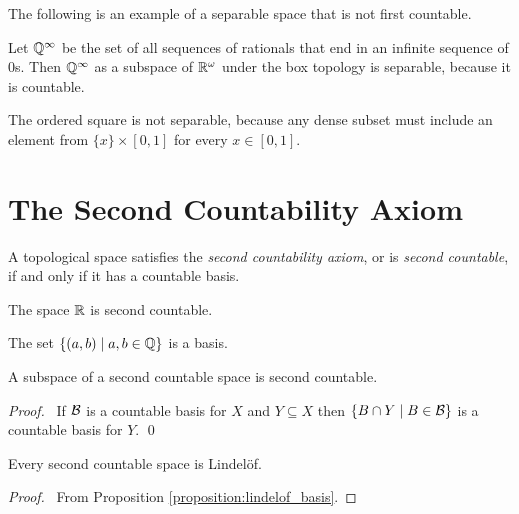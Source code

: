 The following is an example of a separable space that is not first countable.
\begin{example}[Choice]
    Let $\mathbb{Q}^\infty$ be the set of all sequences of rationals that end in an
    infinite sequence of 0s. Then $\mathbb{Q}^\infty$ as a subspace of $\mathbb{R}^\omega$
    under the box topology is separable, because it is countable.
\end{example}

\begin{example}
    The ordered square is not separable, because any dense subset must include
    an element from $\{x\} \times [0,1]$ for every $x \in [0,1]$.
\end{example}

\section{The Second Countability Axiom}

\begin{definition}
    A topological space satisfies the \emph{second countability axiom},
    or is \emph{second countable}, if and only if it has a countable basis.    
\end{definition}

\begin{example}
    The space $\mathbb{R}$ is second countable.

    The set $\{ (a,b) \mid a,b \in \mathbb{Q} \}$ is a basis.
\end{example}

\begin{proposition}
    \label{proposition:second_countable_subspace}
    A subspace of a second countable space is second countable.
\end{proposition}

\begin{proof}
    \pf\ If $\mathcal{B}$ is a countable basis for $X$ and $Y \subseteq X$
    then $\{ B \cap Y \mid B \in \mathcal{B} \}$ is a countable basis for $Y$. \qed
\end{proof}

\begin{proposition}[CC]
    \label{proposition:lindelof_second_countable}
    Every second countable space is Lindel\"{o}f.
\end{proposition}

\begin{proof}
    \pf\ From Proposition \ref{proposition:lindelof_basis}.
\end{proof}

